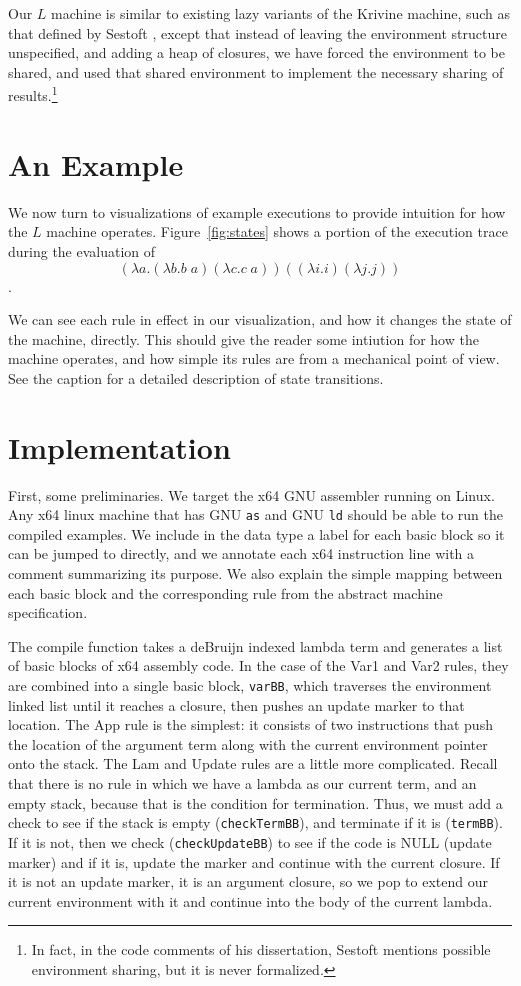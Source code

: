 \documentclass[preprint]{sigplanconf}
\begin{document}
Our $L$ machine is similar to existing lazy variants of the Krivine machine,
such as that defined by Sestoft \cite{sestoft}, except that instead of leaving
the environment structure unspecified, and adding a heap of closures, we have
forced the environment to be shared, and used that shared environment to
implement the necessary sharing of results.\footnote{In fact, in the code
comments of his dissertation, Sestoft mentions possible environment sharing, but
it is never formalized.} 

\section{An Example}

We now turn to visualizations of example executions to provide intuition for how
the $L$ machine operates. Figure~\ref{fig:states} shows a portion of the
execution trace during the evaluation of 
$$(\lambda a.(\lambda b.b \; a) (\lambda c.c \; a)) ((\lambda i.i) (\lambda j.j))$$. 

We can see each rule in effect in our visualization, and how it changes the
state of the machine, directly. This should give the reader some intiution for
how the machine operates, and how simple its rules are from a mechanical point
of view. See the caption for a detailed description of state transitions. 

\section{Implementation}\label{sec:impl}

First, some preliminaries. We target the x64 GNU assembler running on
Linux. Any x64 linux machine that has GNU \texttt{as} and GNU \texttt{ld} should
be able to run the compiled examples.  We include in the data type a label for
each basic block so it can be jumped to directly, and we annotate each x64
instruction line with a comment summarizing its purpose.  We also explain the
simple mapping between each basic block and the corresponding rule from the
abstract machine specification.

The compile function takes a deBruijn indexed lambda term and
generates a list of basic blocks of x64 assembly code. In the case of the Var1
and Var2 rules, they are combined into a single basic block, \texttt{varBB},
which traverses the environment linked list until it reaches a closure, then
pushes an update marker to that location. The App rule is the simplest: it
consists of two instructions that push the location of the argument term along
with the current environment pointer onto the stack. The Lam and Update rules
are a little more complicated.  Recall that there is no rule in which we have a
lambda as our current term, and an empty stack, because that is the condition
for termination. Thus, we must add a check to see if the stack is empty
(\texttt{checkTermBB}), and terminate if it is (\texttt{termBB}). If it is not,
then we check (\texttt{checkUpdateBB}) to see if the code is NULL (update
marker) and if it is, update the marker and continue with the current closure.
If it is not an update marker, it is an argument closure, so we pop to extend
our current environment with it and continue into the body of the current
lambda.
\end{document}
